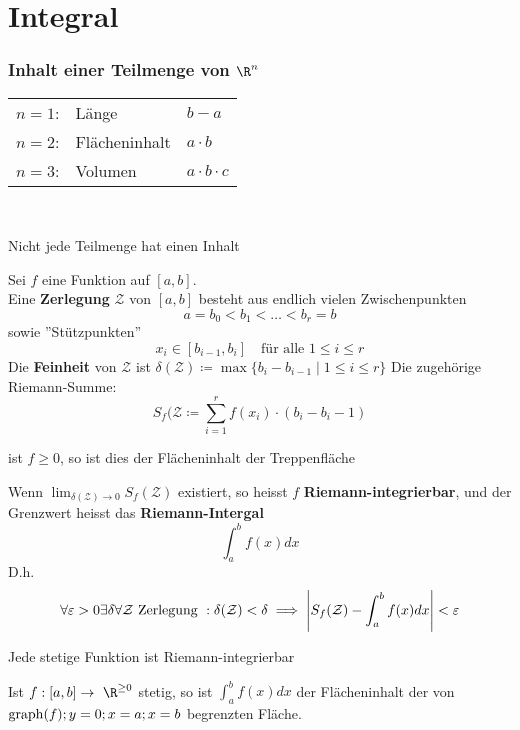 \chapter{Integral}
\subsection{Inhalt einer Teilmenge von $\R^n$}
\begin{tabular}{ l l l }
	$n=1$:	&Länge		&$b-a$			\\
	$n=2$:	&Flächeninhalt	&$a \cdot b$		\\
	$n=3$:	&Volumen		&$a \cdot b \cdot c$	
\end{tabular}\\
\begin{bem}
	Nicht jede Teilmenge hat einen Inhalt
\end{bem}
Sei $f$ eine Funktion auf $[a,b]$. \\
Eine \textbf{Zerlegung} $\mathcal{Z}$ von $[a,b]$ besteht aus endlich vielen Zwischenpunkten
\[ a = b_0 < b_1 < \dots < b_r = b \]
sowie ''Stützpunkten''
\[ x_i \in [b_{i-1},b_i] \quad \text{für alle } 1 \leq i \leq r \]
Die \textbf{Feinheit} von $\mathcal{Z}$ ist $\delta(\mathcal{Z}) \coloneqq \max\{ b_i - b_{i-1} \mid 1 \leq i \leq r \}$
Die zugehörige Riemann-Summe:
\[ S_f(\mathcal{Z} \coloneqq \sum_{i=1}^r f(x_i) \cdot (b_i - b_i-1) \]
\begin{bem}
	ist $f \geq 0$, so ist dies der Flächeninhalt der Treppenfläche
\end{bem}
\begin{def*}[note = Riemann-Integral , index = Riemann-Integral]
	Wenn $\lim_{\delta(\mathcal{Z}) \rightarrow 0} S_f(\mathcal{Z})$ existiert, so heisst $f$ \textbf{Riemann-integrierbar}, und der Grenzwert heisst das \textbf{Riemann-Intergal}
	\[ \int_a^b f(x) dx \]
	D.h.
	\[ \forall \epsilon > 0 \exists \delta \forall \mathcal{Z} \text{ Zerlegung }: \delta(\mathcal{Z}) < \delta \implies \abs{S_f(\mathcal{Z}) - \int_a^b f(x) dx} < \epsilon \]
\end{def*}
\begin{satz*}
	Jede stetige Funktion ist Riemann-integrierbar
\end{satz*}
\begin{fakt}
	Ist $f: [a,b] \rightarrow \R^{\geq 0}$ stetig, so ist $\int_a^b f(x) dx$ der Flächeninhalt der von $\operatorname{graph}(f) ; y = 0 ; x = a ; x = b$ begrenzten Fläche.
\end{fakt}

